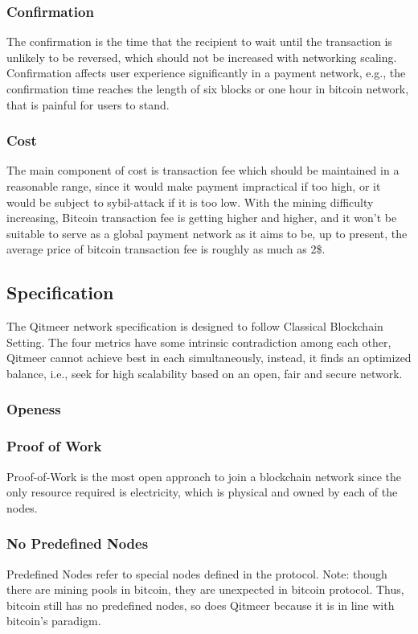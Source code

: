 \documentclass[a4paper,11pt]{article}
\begin{document}
\subsubsection*{Confirmation}
The confirmation is the time that the recipient to wait until the transaction is unlikely to be reversed, which should not be increased with networking scaling. Confirmation affects user experience significantly in a payment network, e.g., the confirmation time reaches the length of six blocks or one hour in bitcoin network,  that is painful for users to stand.
\subsubsection*{Cost}
The main component of cost is transaction fee which should be maintained in a  reasonable range, since it would make payment impractical if too high, or it would be subject to sybil-attack if it is too low. With the mining difficulty increasing, Bitcoin transaction fee is getting higher and higher, and it won’t be suitable to serve as a global payment network as it aims to be, up to present, the average price of bitcoin transaction fee is roughly as much as 2\$. 

\subsection{Specification}
The Qitmeer network specification is designed to follow Classical Blockchain Setting. The four metrics have some intrinsic contradiction among each other, Qitmeer cannot achieve best in each simultaneously, instead, it finds an optimized balance, i.e., seek for high scalability based on an open, fair and secure network.
\subsubsection{Openess}
\subsubsection*{Proof of Work}
Proof-of-Work is the most open approach to join a blockchain network since the only resource required is electricity, which is physical and owned by each of the nodes.  
\subsubsection*{No Predefined Nodes}
Predefined Nodes refer to special nodes defined in the protocol. Note: though there are mining pools in bitcoin,  they are unexpected in bitcoin protocol. Thus,  bitcoin still has no predefined nodes, so does Qitmeer because it is in line with bitcoin’s paradigm.
\end{document}
